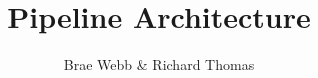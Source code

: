 \documentclass{csse4400}
\title{Pipeline Architecture}
\author{Brae Webb \& Richard Thomas}
\date{\week{2}}
\begin{document}
\makecover



% 
% 
\end{document}
